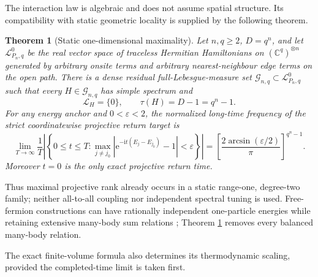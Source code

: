 \documentclass[10pt]{article}
\newtheorem{theorem}{Theorem}
\theoremstyle{definition}
\newcommand{\C}{\mathbb C}
\newcommand{\ee}{\mathrm e}
\newcommand{\ii}{\mathrm i}
\newcommand{\Rel}{\mathcal L}
\begin{document}
The interaction law is algebraic and does not assume spatial structure.  Its
compatibility with static geometric locality is supplied by the following
theorem.

\begin{theorem}[Static one-dimensional maximality]
\label{thm:path}
Let $n,q\ge2$, $D=q^n$, and let $\mathcal L_{P_n,q}^0$ be the real
vector space of traceless Hermitian Hamiltonians on
$(\C^q)^{\otimes n}$ generated by arbitrary onsite terms and arbitrary
nearest-neighbour edge terms on the open path.  There is a dense residual
full-Lebesgue-measure set $\mathcal G_{n,q}\subset\mathcal L_{P_n,q}^0$
such that every $H\in\mathcal G_{n,q}$ has simple spectrum and
\begin{equation}
 \Rel_H=\{0\},\qquad \tau(H)=D-1=q^n-1.                \label{eq:pathrank}
\end{equation}
For any energy anchor and $0<\varepsilon<2$, the normalized long-time
frequency of the strict coordinatewise projective return target is
\begin{equation}
 \boxed{
 \lim_{T\to\infty}\frac1T\left|\left\{0\le t\le T:
 \max_{j\ne j_0}
 \left|\ee^{-\ii t(E_j-E_{j_0})}-1\right|<\varepsilon
 \right\}\right|
 =\left[\frac{2\arcsin(\varepsilon/2)}{\pi}\right]^{q^n-1}.}
 \label{eq:pathdensity}
\end{equation}
Moreover $t=0$ is the only exact projective return time.
\end{theorem}

Thus maximal projective rank already occurs in a static range-one,
degree-two family; neither all-to-all coupling nor independent spectral
tuning is used.  Free-fermion constructions can have
rationally independent one-particle energies while retaining extensive
many-body sum relations \cite{RiddellBertini2024}; Theorem
\ref{thm:path} removes every balanced many-body relation.

The exact finite-volume formula also determines its thermodynamic scaling,
provided the completed-time limit is taken first.
\end{document}
